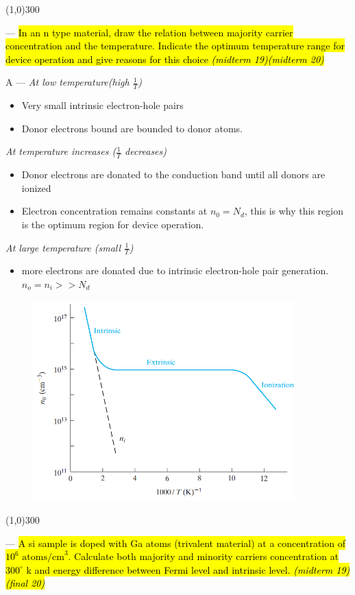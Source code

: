 \documentclass[12pt,a4paper]{article}
\newcounter{question}
\newcommand\Que[1]{
   \line(1,0){300}
   \leavevmode\par
   \stepcounter{question}
   \noindent
   \fbox{\thequestion. Q} --- \hl{#1}\par}
\newcommand\Ans[2][]{%
    \leavevmode\par\noindent
   {\leftskip16pt
    A --- \textbf{#1}#2\par}}
\begin{document}
\begin{large}
\Que{
In an n type material, draw the relation between majority carrier concentration and the temperature. Indicate the optimum temperature range for device operation and give reasons for this choice \hfill \textit{(midterm 19)(midterm 20)}
}
\Ans{
\emph{At low temperature(high $\frac{1}{T}$)}
\begin{itemize}
\item Very small intrinsic electron-hole pairs
\item Donor electrons bound are bounded to donor atoms.
\end{itemize}
\emph{At temperature increases ($\frac{1}{T}$ decreases)}
\begin{itemize}
\item Donor electrons are donated to the conduction band until all donors are ionized
\item Electron concentration remains constants at $n_0 = N_d$, this is why this region is the optimum region for device operation.
\end{itemize}
\emph{At large temperature (small $\frac{1}{T}$)}
\begin{itemize}
\item more electrons are donated due to intrinsic electron-hole pair generation. $n_o = n_i >> N_d$
\end{itemize}

\begin{figure}[H] 
	\centering
	\includegraphics[width = 0.9\textwidth]{concentration and temp}
	\label{fig:concentration and temp}
\end{figure}


}

\Que{
A si sample is doped with Ga atoms (trivalent material) at a concentration of $10^6$ $\text{atoms/cm}^{3}$. Calculate both majority and minority carriers concentration at $300^{\circ}$ k and energy difference between Fermi level and intrinsic level. \hfill \textit{(midterm 19)(final 20)}
}


\end{large}
\end{document}
